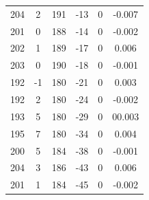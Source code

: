 \documentclass[a4paper, 12pt]{article}
\begin{document}
\begin{table}[H]
\begin{tabular}{@{}cccccc@{}}
    204                   & 2                     & 191               & -13               & 0                 & -0.007              \\
    201                   & 0                     & 188               & -14               & 0                 & -0.002              \\
    202                   & 1                     & 189               & -17               & 0                 & 0.006               \\
    203                   & 0                     & 190               & -18               & 0                 & -0.001              \\
    192                   & -1                    & 180               & -21               & 0                 & 0.003               \\
    192                   & 2                     & 180               & -24               & 0                 & -0.002              \\
    193                   & 5                     & 180               & -29               & 0                 & 00.003              \\
    195                   & 7                     & 180               & -34               & 0                 & 0.004               \\
    200                   & 5                     & 184               & -38               & 0                 & -0.001              \\
    204                   & 3                     & 186               & -43               & 0                 & 0.006               \\
    201                   & 1                     & 184               & -45               & 0                 & -0.002              \\ \bottomrule
    \end{tabular}
    \end{table}
\end{document}
